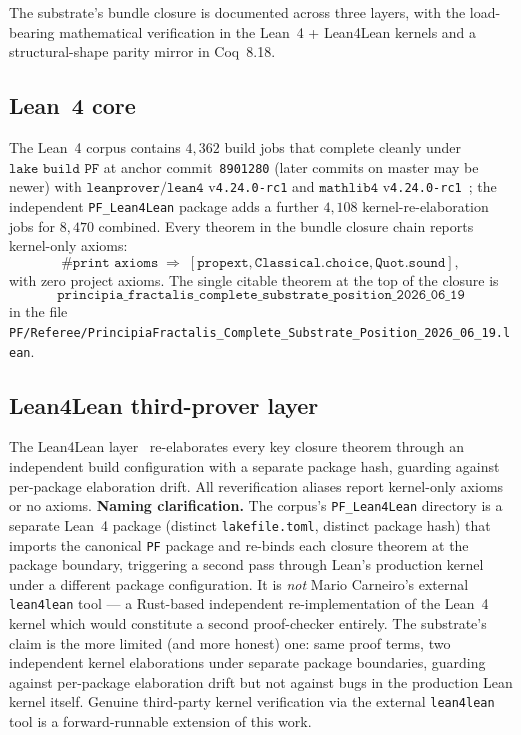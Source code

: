 \documentclass[11pt,a4paper]{amsart}
\theoremstyle{plain}
\theoremstyle{definition}
\begin{document}
The substrate's bundle closure is documented across three layers, with the load-bearing mathematical verification in the Lean~4 + Lean4Lean kernels and a structural-shape parity mirror in Coq~8.18.

\subsection{Lean~4 core}

The Lean~4 corpus contains $4{,}362$ build jobs that complete cleanly under $\texttt{lake build PF}$ at anchor commit~\texttt{8901280} (later commits on master may be newer) with $\texttt{leanprover/lean4}$ v\texttt{4.24.0-rc1} and $\texttt{mathlib4}$ v\texttt{4.24.0-rc1}~\cite{moura-ullrich2021,mathlib2020}; the independent \texttt{PF\_Lean4Lean} package adds a further $4{,}108$ kernel-re-elaboration jobs for $8{,}470$ combined. Every theorem in the bundle closure chain reports kernel-only axioms:
\[
\texttt{\#print axioms} \;\Longrightarrow\; [\texttt{propext}, \texttt{Classical.choice}, \texttt{Quot.sound}],
\]
with zero project axioms. The single citable theorem at the top of the closure is
\[
\texttt{principia\_fractalis\_complete\_substrate\_position\_2026\_06\_19}
\]
in the file \texttt{PF/Referee/PrincipiaFractalis\_Complete\_Substrate\_Position\_2026\_06\_19.lean}.

\subsection{Lean4Lean third-prover layer}\label{subsec:cross-prover}

The Lean4Lean layer~\cite{carneiro2024} re-elaborates every key closure theorem through an independent build configuration with a separate package hash, guarding against per-package elaboration drift. All reverification aliases report kernel-only axioms or no axioms. \textbf{Naming clarification.} The corpus's \texttt{PF\_Lean4Lean} directory is a separate Lean~4 package (distinct \texttt{lakefile.toml}, distinct package hash) that imports the canonical \texttt{PF} package and re-binds each closure theorem at the package boundary, triggering a second pass through Lean's production kernel under a different package configuration. It is \emph{not} Mario Carneiro's external \texttt{lean4lean} tool --- a Rust-based independent re-implementation of the Lean~4 kernel which would constitute a second proof-checker entirely. The substrate's claim is the more limited (and more honest) one: same proof terms, two independent kernel elaborations under separate package boundaries, guarding against per-package elaboration drift but not against bugs in the production Lean kernel itself. Genuine third-party kernel verification via the external \texttt{lean4lean} tool is a forward-runnable extension of this work.
\end{document}

